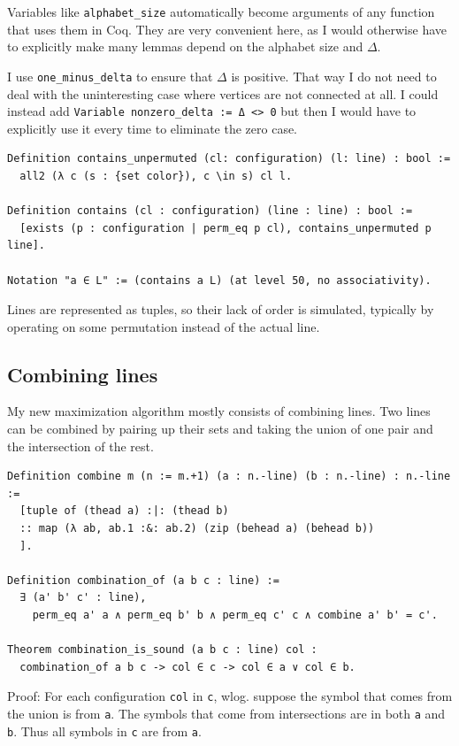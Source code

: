 \documentclass[english, 12pt, a4paper, sci, a-1b, online]{aaltothesis}
\newcommand\icoq[1]{\texttt{#1}}
\begin{document}
Variables like \icoq{alphabet_size} automatically become arguments of any function that uses them in Coq. They are very convenient here, as I would otherwise have to explicitly make many lemmas depend on the alphabet size and $\Delta$.

I use \icoq{one_minus_delta} to ensure that $\Delta$ is positive. That way I do not need to deal with the uninteresting case where vertices are not connected at all. I could instead add \icoq{Variable nonzero_delta := Δ <> 0} but then I would have to explicitly use it every time to eliminate the zero case.

\begin{listing}[h]
\begin{verbatim}
Definition contains_unpermuted (cl: configuration) (l: line) : bool :=
  all2 (λ c (s : {set color}), c \in s) cl l.

Definition contains (cl : configuration) (line : line) : bool :=
  [exists (p : configuration | perm_eq p cl), contains_unpermuted p line].

Notation "a ∈ L" := (contains a L) (at level 50, no associativity).
\end{verbatim}
\caption{Lines are represented as tuples, so their lack of order is simulated, typically by operating on some permutation instead of the actual line.}
\end{listing}

\subsection{Combining lines}

My new maximization algorithm mostly consists of combining lines. Two lines can be combined by pairing up their sets and taking the union of one pair and the intersection of the rest.

\begin{verbatim}
Definition combine m (n := m.+1) (a : n.-line) (b : n.-line) : n.-line :=
  [tuple of (thead a) :|: (thead b)
  :: map (λ ab, ab.1 :&: ab.2) (zip (behead a) (behead b))
  ].

Definition combination_of (a b c : line) :=
  ∃ (a' b' c' : line),
    perm_eq a' a ∧ perm_eq b' b ∧ perm_eq c' c ∧ combine a' b' = c'.

Theorem combination_is_sound (a b c : line) col :
  combination_of a b c -> col ∈ c -> col ∈ a ∨ col ∈ b.
\end{verbatim}

Proof: For each configuration \icoq{col} in \icoq{c}, wlog. suppose the symbol that comes from the union is from \icoq{a}. The symbols that come from intersections are in both \icoq{a} and \icoq{b}. Thus all symbols in \icoq{c} are from \icoq{a}.
\end{document}

